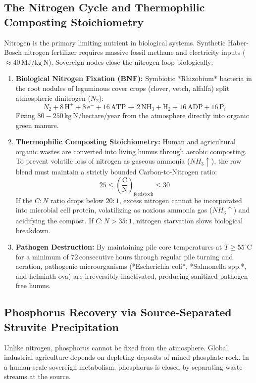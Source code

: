 \subsection{The Nitrogen Cycle and Thermophilic Composting Stoichiometry}
Nitrogen is the primary limiting nutrient in biological systems. Synthetic Haber-Bosch nitrogen fertilizer requires massive fossil methane and electricity inputs ($\approx 40\,\mathrm{MJ/kg\ N}$). Sovereign nodes close the nitrogen loop biologically:
\begin{enumerate}
    \item \textbf{Biological Nitrogen Fixation (BNF):} Symbiotic *Rhizobium* bacteria in the root nodules of leguminous cover crops (clover, vetch, alfalfa) split atmospheric dinitrogen ($N_2$):
    \begin{equation}
    N_2 + 8\,\mathrm{H}^+ + 8\,\mathrm{e}^- + 16\,\mathrm{ATP} \to 2\,\mathrm{NH}_3 + \mathrm{H}_2 + 16\,\mathrm{ADP} + 16\,\mathrm{P}_i
    \label{eq:nitrogen_fixation}
    \end{equation}
    Fixing $80 - 250\,\mathrm{kg\ N/hectare/year}$ from the atmosphere directly into organic green manure.
    \item \textbf{Thermophilic Composting Stoichiometry:} Human and agricultural organic wastes are converted into living humus through aerobic composting. To prevent volatile loss of nitrogen as gaseous ammonia ($NH_3 \uparrow$), the raw blend must maintain a strictly bounded Carbon-to-Nitrogen ratio:
    \begin{equation}
    25 \le \left( \frac{\mathrm{C}}{\mathrm{N}} \right)_{\mathrm{feedstock}} \le 30
    \label{eq:cn_ratio_bound}
    \end{equation}
    If the $C:N$ ratio drops below $20:1$, excess nitrogen cannot be incorporated into microbial cell protein, volatilizing as noxious ammonia gas ($NH_3 \uparrow$) and acidifying the compost. If $C:N > 35:1$, nitrogen starvation slows biological breakdown. 
    \item \textbf{Pathogen Destruction:} By maintaining pile core temperatures at $T \ge 55^\circ\mathrm{C}$ for a minimum of $72\,\mathrm{consecutive\ hours}$ through regular pile turning and aeration, pathogenic microorganisms (*Escherichia coli*, *Salmonella spp.*, and helminth ova) are irreversibly inactivated, producing sanitized pathogen-free humus.
\end{enumerate}

\subsection{Phosphorus Recovery via Source-Separated Struvite Precipitation}
Unlike nitrogen, phosphorus cannot be fixed from the atmosphere. Global industrial agriculture depends on depleting deposits of mined phosphate rock. In a human-scale sovereign metabolism, phosphorus is closed by separating waste streams at the source.

